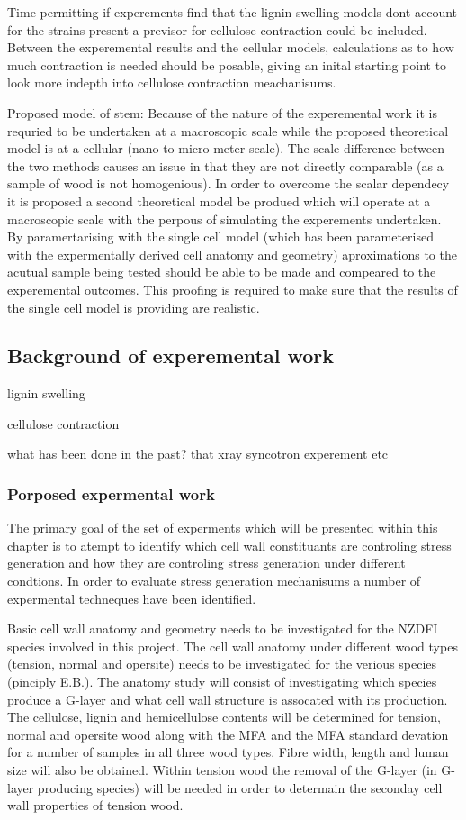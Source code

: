 \documentclass{article}
\begin{document}
Time permitting if experements find that the lignin swelling models dont account
for the strains present a previsor for cellulose contraction could be included.
Between the experemental results and the cellular models, calculations as to how
much contraction is needed should be posable, giving an inital starting point to
look more indepth into cellulose contraction meachanisums.

Proposed model of stem:
Because of the nature of the experemental work it is requried to be undertaken
at a macroscopic scale while the proposed theoretical model is at a cellular
(nano to micro meter scale). The scale difference between the two methods causes
an issue in that they are not directly comparable (as a sample of wood is not
homogenious). In order to overcome the scalar dependecy it is proposed a second
theoretical model be produed which will operate at a macroscopic scale with the
perpous of simulating the experements undertaken. By paramertarising with the
single cell model (which has been parameterised with the expermentally derived
cell anatomy and geometry) aproximations to the acutual sample being tested
should be able to be made and compeared to the experemental outcomes. This
proofing is required to make sure that the results of the single cell model is
providing are realistic.

\subsection{Background of experemental work}

lignin swelling

cellulose contraction

what has been done in the past?
that xray syncotron experement etc

\subsubsection{Porposed expermental work}

The primary goal of the set of experments which will be presented within this
chapter is to atempt to identify which cell wall constituants are controling
stress generation and how they are controling stress generation under different
condtions. In order to evaluate stress generation mechanisums a number of
expermental techneques have been identified.

Basic cell wall anatomy and geometry needs to be investigated for the NZDFI
species involved in this project. The cell wall anatomy under different wood
types (tension, normal and opersite) needs to be investigated for the verious
species (pinciply E.B.). The anatomy study will consist of investigating which
species produce a G-layer and what cell wall structure is assocated with its
production. The cellulose, lignin and hemicellulose contents will be determined
for tension, normal and opersite wood along with the MFA and the MFA standard
devation for a number of samples in all three wood types. Fibre width, length
and luman size will also be obtained. Within tension wood the removal of the
G-layer (in G-layer producing species) will be needed in order to determain the
seconday cell wall properties of tension wood.
\end{document}
